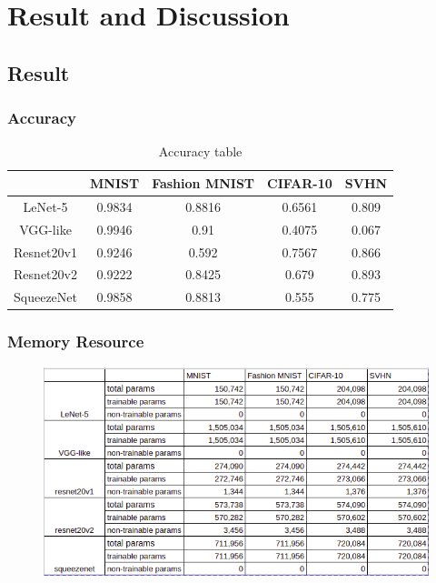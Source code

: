 \documentclass{beamer}
\begin{document}
\section{Result and Discussion} 
\subsection{Result}
\begin{frame}\frametitle{Accuracy}
\begin{table}	
	\centering
	\begin{tabular}{ |c|c|c|c|c| } 
		\hline
		& MNIST & Fashion MNIST & CIFAR-10 & SVHN \\ 
		\hline
		LeNet-5	& 0.9834 & 0.8816 & 0.6561 & 0.809\\
		\hline 
		VGG-like & 0.9946 & 0.91 & 0.4075 & 0.067\\ 
		\hline
		Resnet20v1 & 0.9246 & 0.592 & 0.7567 & 0.866\\ 
		\hline
		Resnet20v2 & 0.9222 & 0.8425 & 0.679 & 0.893\\
		\hline
		SqueezeNet & 0.9858 & 0.8813 & 0.555 & 0.775\\
		\hline
	\end{tabular}
	\caption{Accuracy table}
	\label{tab:accuracy}
\end{table}
\end{frame}
\begin{frame}\frametitle{Memory Resource}
\begin{figure}[h]
	\includegraphics[scale=0.4]{figures/params}
	\centering
	\label{fig:params}
\end{figure}
\end{frame}
\end{document}
